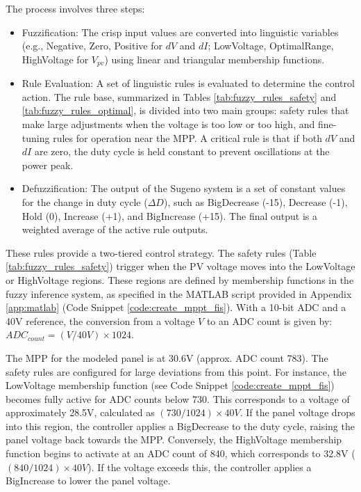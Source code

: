 \documentclass[a4paper,oneside,12pt]{report}
\numberwithin{equation}{chapter}
\begin{document}
The process involves three steps:
\begin{itemize}
    \item Fuzzification: The crisp input values are converted into linguistic variables (e.g., Negative, Zero, Positive for $dV$ and $dI$; {Low\textunderscore Voltage}, {Optimal\textunderscore Range}, {High\textunderscore Voltage} for $V_{pv}$) using linear and triangular membership functions.
    \item Rule Evaluation: A set of linguistic rules is evaluated to determine the control action. The rule base, summarized in Tables \ref{tab:fuzzy_rules_safety} and \ref{tab:fuzzy_rules_optimal}, is divided into two main groups: safety rules that make large adjustments when the voltage is too low or too high, and fine-tuning rules for operation near the MPP. A critical rule is that if both $dV$ and $dI$ are zero, the duty cycle is held constant to prevent oscillations at the power peak.
    \item Defuzzification: The output of the Sugeno system is a set of constant values for the change in duty cycle ($\Delta D$), such as {Big\textunderscore Decrease} (-15), {Decrease} (-1), {Hold} (0), {Increase} (+1), and {Big\textunderscore Increase} (+15). The final output is a weighted average of the active rule outputs.
\end{itemize}

These rules provide a two-tiered control strategy. The safety rules (Table \ref{tab:fuzzy_rules_safety}) trigger when the PV voltage moves into the {Low\textunderscore Voltage} or {High\textunderscore Voltage} regions. These regions are defined by membership functions in the fuzzy inference system, as specified in the MATLAB script provided in Appendix \ref{app:matlab} (Code Snippet \ref{code:create_mppt_fis}). With a 10-bit ADC and a 40V reference, the conversion from a voltage $V$ to an ADC count is given by: $ADC_{count} = (V / 40V) \times 1024$.

The MPP for the modeled panel is at 30.6V (approx. ADC count 783). The safety rules are configured for large deviations from this point. For instance, the {Low\textunderscore Voltage} membership function (see Code Snippet \ref{code:create_mppt_fis}) becomes fully active for ADC counts below 730. This corresponds to a voltage of approximately 28.5V, calculated as $(730 / 1024) \times 40V$. If the panel voltage drops into this region, the controller applies a {Big\textunderscore Decrease} to the duty cycle, raising the panel voltage back towards the MPP. Conversely, the {High\textunderscore Voltage} membership function begins to activate at an ADC count of 840, which corresponds to 32.8V ($(840 / 1024) \times 40V$). If the voltage exceeds this, the controller applies a {Big\textunderscore Increase} to lower the panel voltage.
\end{document}
